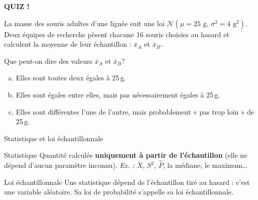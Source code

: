 \documentclass{BeamerTemplate}
\begin{document}
\begin{frame}[plain,t]
  \centerline{\LARGE\bfseries\alert{QUIZ !}}

  \medskip
  La masse des souris adultes d'une lignée suit une loi $\mathcal{N}(\mu = 25\text{ g},\, \sigma^2 = 4\text{ g}^2)$. Deux équipes de recherche pèsent chacune 16 souris choisies au hasard et calculent la moyenne de leur échantillon : $\bar{x}_A$ et $\bar{x}_B$.

  \medskip
  Que peut-on dire des valeurs $\bar{x}_A$ et $\bar{x}_B$?
  \begin{enumerate}[(a)]\itemsep 3mm
    \item Elles sont toutes deux égales à 25\,g.
    \item Elles sont égales entre elles, mais pas nécessairement égales à 25\,g.
    \item Elles sont différentes l'une de l'autre, mais probablement « pas trop loin » de 25\,g.
  \end{enumerate}

  \medskip
\end{frame}

\begin{frame}[t]{Statistique et loi échantillonnale}
  \begin{Boite}{Statistique}
    Quantité calculée \textbf{uniquement à partir de l'échantillon} (elle ne dépend d'aucun paramètre inconnu).
    \emph{Ex. :} $\overline{X}$, $S^2$, $\widehat{P}$, la médiane, le maximum\ldots
  \end{Boite}

  \smallskip
  \begin{Boite}{Loi échantillonnale}
    Une statistique dépend de l'échantillon tiré au hasard : c'est une \alert{variable aléatoire}. Sa loi de probabilité s'appelle sa \alert{loi échantillonnale}.
  \end{Boite}

  \smallskip
\end{frame}
\end{document}

